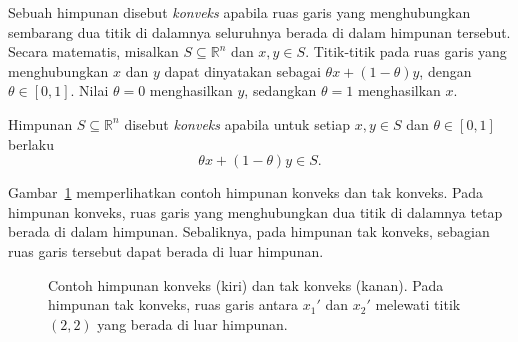 Sebuah himpunan disebut \textit{konveks} apabila ruas garis yang
menghubungkan sembarang dua titik di dalamnya seluruhnya berada di
dalam himpunan tersebut. Secara matematis, misalkan
$S\subseteq\mathbb{R}^n$ dan $x,y\in S$. Titik-titik pada ruas garis
yang menghubungkan $x$ dan $y$ dapat dinyatakan sebagai
$\theta x+(1-\theta)y$, dengan $\theta\in[0,1]$. Nilai $\theta=0$
menghasilkan $y$, sedangkan $\theta=1$ menghasilkan $x$.

\begin{definisi}
\label{def:himpunankonveks}
Himpunan $S\subseteq\mathbb{R}^n$ disebut \textit{konveks} apabila
untuk setiap $x,y\in S$ dan $\theta\in[0,1]$ berlaku
\begin{equation}
    \theta x+(1-\theta)y\in S.
    \label{eq:himpunankonveks}
\end{equation}
\end{definisi}

Gambar~\ref{fig:konveks} memperlihatkan contoh himpunan konveks dan
tak konveks. Pada himpunan konveks, ruas garis yang menghubungkan
dua titik di dalamnya tetap berada di dalam himpunan. Sebaliknya,
pada himpunan tak konveks, sebagian ruas garis tersebut dapat berada
di luar himpunan.

\begin{figure}[H]
\centering
{}
\caption{Contoh himpunan konveks (kiri) dan tak konveks (kanan).
Pada himpunan tak konveks, ruas garis antara $x_1'$ dan $x_2'$
melewati titik $(2,2)$ yang berada di luar himpunan.}
\label{fig:konveks}
\end{figure}


